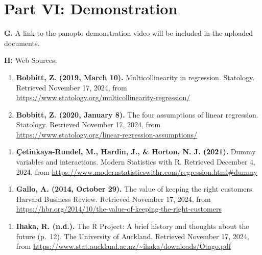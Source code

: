 \documentclass[
]{article}
\providecommand{\tightlist}{%
  \setlength{\itemsep}{0pt}\setlength{\parskip}{0pt}}
\begin{document}
\section{Part VI: Demonstration}\label{part-vi-demonstration}

\textbf{G.} A link to the panopto demonstration video will be included
in the uploaded documents.

\textbf{H:} Web Sources:

\begin{enumerate}
\def\labelenumi{\arabic{enumi}.}
\item
  \textbf{Bobbitt, Z. (2019, March 10).} Multicollinearity in
  regression. Statology. Retrieved November 17, 2024, from
  \url{https://www.statology.org/multicollinearity-regression/}
\item
  \textbf{Bobbitt, Z. (2020, January 8).} The four assumptions of linear
  regression. Statology. Retrieved November 17, 2024, from
  \url{https://www.statology.org/linear-regression-assumptions/}
\end{enumerate}

\begin{enumerate}
\def\labelenumi{\arabic{enumi}.}
\setcounter{enumi}{3}
\tightlist
\item
  \textbf{Çetinkaya-Rundel, M., Hardin, J., \& Horton, N. J. (2021).}
  Dummy variables and interactions. Modern Statistics with R. Retrieved
  December 4, 2024, from
  \url{https://www.modernstatisticswithr.com/regression.html\#dummy}
\end{enumerate}

\begin{enumerate}
\def\labelenumi{\arabic{enumi}.}
\setcounter{enumi}{4}
\tightlist
\item
  \textbf{Gallo, A. (2014, October 29).} The value of keeping the right
  customers. Harvard Business Review. Retrieved November 17, 2024, from
  \url{https://hbr.org/2014/10/the-value-of-keeping-the-right-customers}
\end{enumerate}

\begin{enumerate}
\def\labelenumi{\arabic{enumi}.}
\setcounter{enumi}{5}
\tightlist
\item
  \textbf{Ihaka, R. (n.d.).} The R Project: A brief history and thoughts
  about the future (p.~12). The University of Auckland. Retrieved
  November 17, 2024, from
  \url{https://www.stat.auckland.ac.nz/~ihaka/downloads/Otago.pdf}
\end{enumerate}
\end{document}
